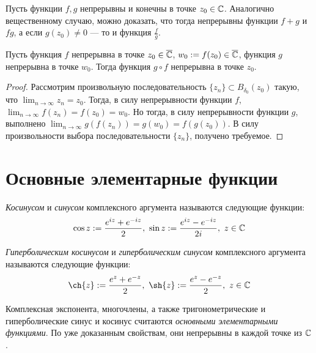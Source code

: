 \begin{note}
	Пусть функции $f, g$ непрерывны и конечны в точке $z_0 \in \mathbb{C}$. Аналогично вещественному случаю, можно доказать, что тогда непрерывны функции $f + g$ и $fg$, а если $g(z_0) \ne 0$ --- то и функция $\frac fg$.
\end{note}

\begin{proposition}
	Пусть функция $f$ непрерывна в точке $z_0 \in \overline{\mathbb{C}}$, $w_0 := f(z_0) \in \overline{\mathbb{C}}$, функция $g$ непрерывна в точке $w_0$. Тогда функция $g \circ f$ непрерывна в точке $z_0$.
\end{proposition}

\begin{proof}
	Рассмотрим произвольную последовательность $\{z_n\} \subset B_{\delta_0}(z_0)$ такую, что $\lim_{n \to \infty}z_n = z_0$. Тогда, в силу непрерывности функции $f$, $\lim_{n \to \infty}f(z_n) = f(z_0) = w_0$. Но тогда, в силу непрерывности функции $g$, выполнено $\lim_{n \to \infty}g(f(z_n)) = g(w_0) = f(g(z_0))$. В силу произвольности выбора последовательности $\{z_n\}$, получено требуемое.
\end{proof}

\section{Основные элементарные функции}

\begin{definition}
	\textit{Косинусом} и \textit{синусом} комплексного аргумента называются следующие функции:
	\[\cos{z} := \frac{e^{iz} + e^{-iz}}2,~\sin{z} := \frac{e^{iz} - e^{-iz}}{2i},~z \in \mathbb{C}\]
\end{definition}

\pagebreak

\begin{definition}
	\textit{Гиперболическим косинусом} и \textit{гиперболическим синусом} комплексного аргумента называются следующие функции:
	\[
		\ch{z} := \frac{e^{z} + e^{-z}}2,~\sh{z} := \frac{e^{z} - e^{-z}}{2},~z \in \Cm
	\]
\end{definition}

\begin{note}
	Комплексная экспонента, многочлены, а также тригонометрические и гиперболические синус и косинус считаются \textit{основными элементарными функциями}. По уже доказанным свойствам, они непрерывны в каждой точке из $\mathbb{C}$.
\end{note}